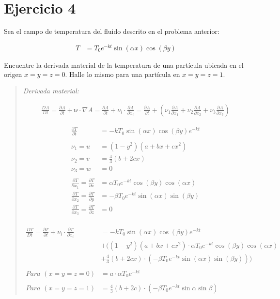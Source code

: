 \documentclass[a4paper,10pt,twoside,final,spanish]{article}
\begin{document}
\section*{Ejercicio 4}

Sea el campo de temperatura del fluido descrito en el problema anterior:

\begin{align*}
T &= T_{0}e^{-kt}\sin{(\alpha x)}\cos{(\beta y)}
\end{align*}

Encuentre la derivada material de la temperatura de una partícula ubicada en el origen 
$x=y=z=0$. Halle lo mismo para una partícula en $x=y=z=1$.

\dotfill

\begin{quote}

\textit{Derivada material:}

\begin{align*}
\frac{DA}{Dt}=\frac{\partial A}{\partial t}+\mathbf{\nu}\cdot\nabla A
=\frac{\partial A}{\partial t}+\nu_{i}\cdot\frac{\partial A}{\partial x_{i}}
=\frac{\partial A}{\partial t}+\left(
\nu_{1}\frac{\partial A}{\partial x_{1}}
+\nu_{2}\frac{\partial A}{\partial x_{2}}
+\nu_{3}\frac{\partial A}{\partial x_{3}}
\right)
\end{align*}

\begin{align*}
\frac{\partial T}{\partial t} &= -kT_{0}\sin{(\alpha x)}\cos{(\beta y)}e^{-kt} \\ \\
\nu_{1}=u &= (1-y^{2})(a+bx+cx^{2}) \\
\nu_{2}=v &= \frac{4}{3}(b+2cx) \\
\nu_{3}=w &= 0 \\ \\
\frac{\partial T}{\partial x_{1}}=\frac{\partial T}{\partial x}
&= \alpha T_{0}e^{-kt}\cos{(\beta y)}\cos{(\alpha x)} \\
\frac{\partial T}{\partial x_{2}}=\frac{\partial T}{\partial y}
&= -\beta T_{0}e^{-kt}\sin{(\alpha x)}\sin{(\beta y)} \\
\frac{\partial T}{\partial x_{3}}=\frac{\partial T}{\partial z} &= 0 \\
\end{align*}

\begin{align*}
\frac{DT}{Dt}=\frac{\partial T}{\partial t}+\nu_{i}\cdot\frac{\partial T}{\partial x_{i}}
&= -kT_{0}\sin{(\alpha x)}\cos{(\beta y)}e^{-kt} \\
&+ ((1-y^{2})(a+bx+cx^{2})\cdot\alpha T_{0}e^{-kt}\cos{(\beta y)}\cos{(\alpha x)} \\
&+ \frac{4}{3}(b+2cx)\cdot(-\beta T_{0}e^{-kt}\sin{(\alpha x)}\sin{(\beta y)})) \\ \\
\textit{Para } (x=y=z=0)
&= a\cdot\alpha T_{0}e^{-kt} \\ \\
\textit{Para } (x=y=z=1)
&= \frac{4}{3}(b+2c)\cdot(-\beta T_{0}e^{-kt}\sin{\alpha}\sin{\beta})
\end{align*}

\end{quote}
\end{document}
